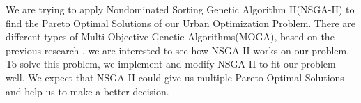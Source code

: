 \iffalse
In your thesis document, you should have a good abstract that can answer the following questions: (1) What is the problem you worked on, (2) Why is it interesting or motivation for working on this problem, (3) How did you achieve the solution or What did you do?, and (4) How well did your idea work out?
\fi

We are trying to apply Nondominated Sorting Genetic Algorithm II(NSGA-II) to find the Pareto Optimal Solutions of our Urban Optimization Problem. There are different types of Multi-Objective Genetic Algorithms(MOGA), based on the previous research \cite{NSGA-II}\cite{Magnier_2010_Multiobjective}, we are interested to see how NSGA-II works on our problem. To solve this problem, we implement and modify NSGA-II to fit our problem well. We expect that NSGA-II could give us multiple Pareto Optimal Solutions and help us to make a better decision.
